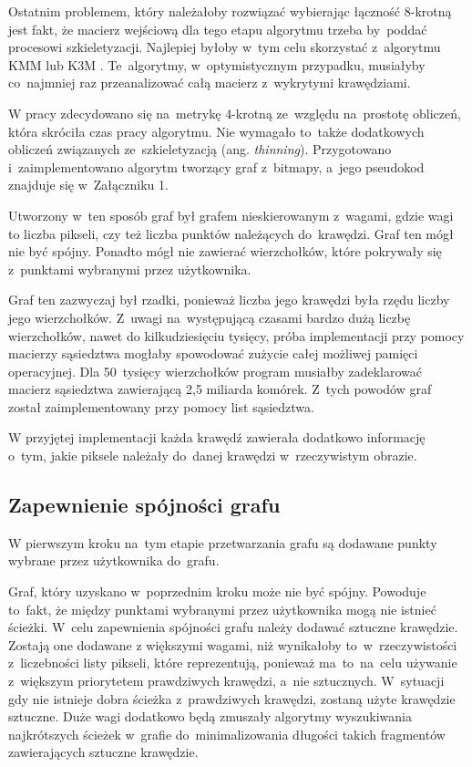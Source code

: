 \documentclass[a4paper,11pt,twoside,openright]{report}
\theoremstyle{definition}
\begin{document}
Ostatnim problemem, który należałoby rozwiązać wybierając łączność 8-krotną
jest fakt, że macierz wejściową dla tego etapu algorytmu trzeba by~poddać procesowi
szkieletyzacji. Najlepiej byłoby w~tym celu skorzystać z~algorytmu KMM \cite{KMM}
lub K3M \cite{K3M}. Te~algorytmy, w~optymistycznym przypadku, musiałyby co~najmniej
raz przeanalizować całą macierz z~wykrytymi krawędziami.

\bigskip

W pracy zdecydowano się na~metrykę 4-krotną ze~względu na~prostotę obliczeń,
która skróciła czas pracy algorytmu. Nie wymagało to~także dodatkowych
obliczeń związanych ze~szkieletyzacją (ang. \textit{thinning}). Przygotowano
i~zaimplementowano algorytm tworzący graf z~bitmapy, a~jego pseudokod znajduje
się w~Załączniku 1.

Utworzony w~ten sposób graf był grafem nieskierowanym z~wagami, gdzie wagi to
liczba pikseli, czy też liczba punktów należących do~krawędzi. Graf ten mógł nie być
spójny. Ponadto mógł nie zawierać wierzchołków, które pokrywały się z~punktami
wybranymi przez użytkownika.

Graf ten zazwyczaj był rzadki, ponieważ liczba jego krawędzi była rzędu liczby
jego wierzchołków.  Z~uwagi na~występującą czasami bardzo dużą liczbę wierzchołków, nawet
do kilkudziesięciu tysięcy, próba implementacji przy pomocy macierzy sąsiedztwa
mogłaby spowodować zużycie całej możliwej pamięci operacyjnej. Dla 50~tysięcy
wierzchołków program musiałby zadeklarować macierz sąsiedztwa zawierającą 2,5
miliarda komórek. Z~tych powodów graf został zaimplementowany przy pomocy list sąsiedztwa.

W przyjętej implementacji każda krawędź zawierała dodatkowo informację o~tym, jakie
piksele należały do~danej krawędzi w~rzeczywistym obrazie.

\subsection {Zapewnienie spójności grafu}

W pierwszym kroku na~tym etapie przetwarzania grafu są dodawane punkty wybrane
przez użytkownika do~grafu.

Graf, który uzyskano w~poprzednim kroku może nie być spójny. Powoduje to~fakt,
że między punktami wybranymi przez użytkownika mogą nie istnieć ścieżki. W~celu
zapewnienia spójności grafu należy dodawać sztuczne krawędzie. Zostają one dodawane
z większymi wagami, niż wynikałoby to~w~rzeczywistości z~liczebności listy pikseli,
które reprezentują, ponieważ ma~to~na~celu używanie z~większym priorytetem prawdziwych
krawędzi, a~nie sztucznych. W~sytuacji gdy nie istnieje dobra ścieżka z~prawdziwych
krawędzi, zostaną użyte krawędzie sztuczne. Duże wagi dodatkowo będą zmuszały
algorytmy wyszukiwania najkrótszych ścieżek w~grafie do~minimalizowania długości
takich fragmentów zawierających sztuczne krawędzie.
\end{document}

